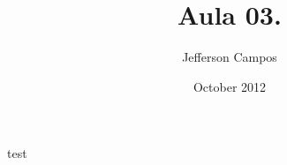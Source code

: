 \documentclass[a4paper,12pt]{article}
\title{Aula 03.}
\author{Jefferson Campos}
\date{October 2012}
\begin{document}
\maketitle

\newpage

test
\end{document}
